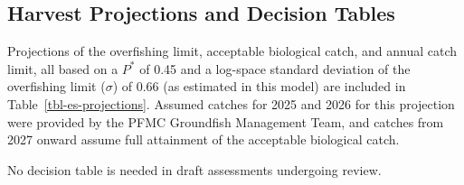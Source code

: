 \documentclass[
]{scrartcl}
\begin{document}
\subsection*{Harvest Projections and Decision
Tables}\label{harvest-projections-and-decision-tables}

Projections of the overfishing limit, acceptable biological catch, and
annual catch limit, all based on a \(P^*\) of 0.45 and a log-space
standard deviation of the overfishing limit (\(\sigma\)) of 0.66 (as
estimated in this model) are included in Table~\ref{tbl-es-projections}.
Assumed catches for 2025 and 2026 for this projection were provided by
the PFMC Groundfish Management Team, and catches from 2027 onward assume
full attainment of the acceptable biological catch.

No decision table is needed in draft assessments undergoing review.
\end{document}
